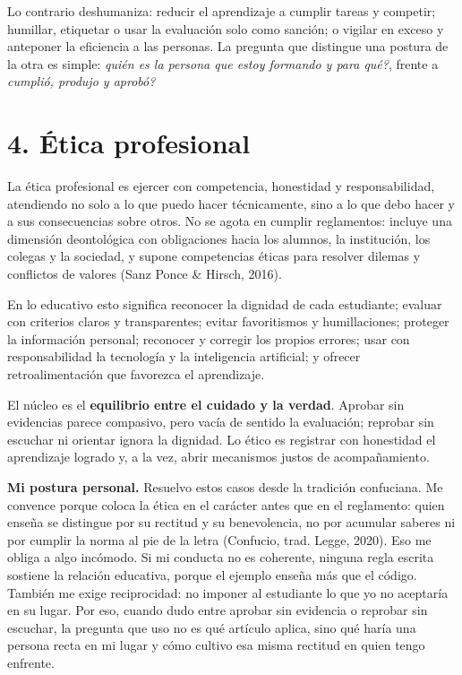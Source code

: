 \documentclass[12pt]{article}
\newcommand{\cita}[1]{\textup{(#1)}}
\begin{document}
Lo contrario deshumaniza: reducir el aprendizaje a cumplir tareas y competir; humillar,
etiquetar o usar la evaluación solo como sanción; o vigilar en exceso y anteponer la
eficiencia a las personas. La pregunta que distingue una postura de la otra es simple:
\textit{\textquestiondown{}quién es la persona que estoy formando y para qué?}, frente a \textit{\textquestiondown{}cumplió,
produjo y aprobó?}

\section*{4. Ética profesional}

La ética profesional es ejercer con competencia, honestidad y responsabilidad, atendiendo
no solo a lo que puedo hacer técnicamente, sino a lo que debo hacer y a sus consecuencias
sobre otros. No se agota en cumplir reglamentos: incluye una dimensión deontológica con
obligaciones hacia los alumnos, la institución, los colegas y la sociedad, y supone
competencias éticas para resolver dilemas y conflictos de valores
\cita{Sanz Ponce \& Hirsch, 2016}.

En lo educativo esto significa reconocer la dignidad de cada estudiante; evaluar con
criterios claros y transparentes; evitar favoritismos y humillaciones; proteger la
información personal; reconocer y corregir los propios errores; usar con responsabilidad la
tecnología y la inteligencia artificial; y ofrecer retroalimentación que favorezca el
aprendizaje.

El núcleo es el \textbf{equilibrio entre el cuidado y la verdad}. Aprobar sin evidencias
parece compasivo, pero vacía de sentido la evaluación; reprobar sin escuchar ni orientar
ignora la dignidad. Lo ético es registrar con honestidad el aprendizaje logrado y, a la
vez, abrir mecanismos justos de acompañamiento.

\textbf{Mi postura personal.} Resuelvo estos casos desde la tradición confuciana. Me
convence porque coloca la ética en el carácter antes que en el reglamento: quien enseña se
distingue por su rectitud y su benevolencia, no por acumular saberes ni por cumplir la norma
al pie de la letra \cita{Confucio, trad. Legge, 2020}. Eso me obliga a algo incómodo. Si mi
conducta no es coherente, ninguna regla escrita sostiene la relación educativa, porque el
ejemplo enseña más que el código. También me exige reciprocidad: no imponer al estudiante lo
que yo no aceptaría en su lugar. Por eso, cuando dudo entre aprobar sin evidencia o reprobar
sin escuchar, la pregunta que uso no es qué artículo aplica, sino qué haría una persona recta
en mi lugar y cómo cultivo esa misma rectitud en quien tengo enfrente.
\end{document}

